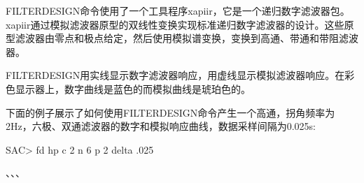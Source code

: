 FILTERDESIGN命令使用了一个工具程序xapiir，它是一个递归数字滤波器包。xapiir通过模拟滤波器原型的双线性变换实现标准递归数字滤波器的设计。这些原型滤波器由零点和极点给定，然后使用模拟谱变换，变换到高通、带通和带阻滤波器。

FILTERDESIGN用实线显示数字滤波器响应，用虚线显示模拟滤波器响应。在彩色显示器上，数字曲线是蓝色的而模拟曲线是琥珀色的。

下面的例子展示了如何使用FILTERDESIGN命令产生一个高通，拐角频率为2Hz，六极、双通滤波器的数字和模拟响应曲线，数据采样间隔为0.025s:
\begin{SACCode}
SAC> fd hp c 2 n 6 p 2 delta .025
\end{SACCode}

、、、
